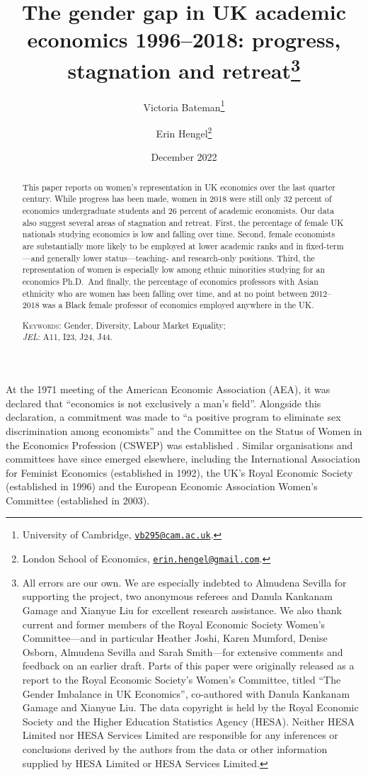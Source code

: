 \documentclass[a4paper, 1]{article}
\date{December 2022}
\title{\LARGE{The gender gap in UK academic economics 1996--2018: progress, stagnation and retreat}\thanks{All errors are our own. We are especially indebted to Almudena Sevilla for supporting the project, two anonymous referees and Danula Kankanam Gamage and Xianyue Liu for excellent research assistance. We also thank current and former members of the Royal Economic Society Women's Committee---and in particular Heather Joshi, Karen Mumford, Denise Osborn, Almudena Sevilla and Sarah Smith---for extensive comments and feedback on an earlier draft. Parts of this paper were originally released as a report to the Royal Economic Society's Women's Committee, titled ``The Gender Imbalance in UK Economics'', co-authored with Danula Kankanam Gamage and Xianyue Liu. The data copyright is held by the Royal Economic Society and the Higher Education Statistics Agency (HESA). Neither HESA Limited nor HESA Services Limited are responsible for any inferences or conclusions derived by the authors from the data or other information supplied by HESA Limited or HESA Services Limited.}}
\author{\onehalfspacing
  Victoria Bateman\thanks{University of Cambridge, \href{mailto:vb295@cam.ac.uk}{\nolinkurl{vb295@cam.ac.uk}}.} \and Erin Hengel\thanks{London School of Economics, \href{mailto:erin.hengel@gmail.com}{\nolinkurl{erin.hengel@gmail.com}}.}
}
\begin{document}
\maketitle

\begin{abstract}
\noindent This paper reports on women's representation in UK economics over the last quarter century. While progress has been made, women in 2018 were still only 32 percent of economics undergraduate students and 26 percent of academic economists. Our data also suggest several areas of stagnation and retreat. First, the percentage of female UK nationals studying economics is low and falling over time. Second, female economists are substantially more likely to be employed at lower academic ranks and in fixed-term---and generally lower status---teaching- and research-only positions. Third, the representation of women is especially low among ethnic minorities studying for an economics Ph.D.~And finally, the percentage of economics professors with Asian ethnicity who are women has been falling over time, and at no point between 2012--2018 was a Black female professor of economics employed anywhere in the UK.

\vspace{1cm}
\noindent\textsc{Keywords}: Gender, Diversity, Labour Market Equality;\\
\textit{JEL}: A11, I23, J24, J44.
\end{abstract}

\clearpage
{}

\clearpage


At the 1971 meeting of the American Economic Association (AEA), it was declared that ``economics is not exclusively a man's field''. Alongside this declaration, a commitment was made to ``a positive program to eliminate sex discrimination among economists'' and the Committee on the Status of Women in the Economics Profession (CSWEP) was established \citep{Cherrier2017}. Similar organisations and committees have since emerged elsewhere, including the International Association for Feminist Economics (established in 1992), the UK's Royal Economic Society (established in 1996) and the European Economic Association Women's Committee (established in 2003).
\end{document}
